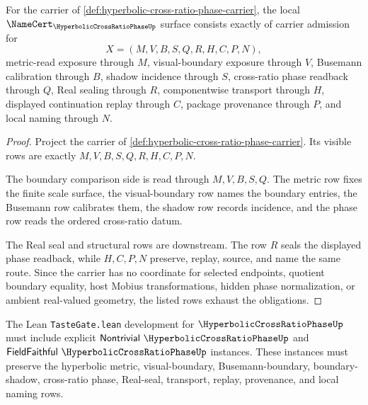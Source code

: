 \begin{theorem}
\label{thm:hyperbolic-cross-ratio-phase-namecert-obligations}
For the carrier of \autoref{def:hyperbolic-cross-ratio-phase-carrier}, the local $\NameCert_{\HyperbolicCrossRatioPhaseUp}$ surface consists exactly of carrier admission for
$$
X=(M,V,B,S,Q,R,H,C,P,N),
$$
metric-read exposure through $M$, visual-boundary exposure through $V$, Busemann calibration through $B$, shadow incidence through $S$, cross-ratio phase readback through $Q$, Real sealing through $R$, componentwise transport through $H$, displayed continuation replay through $C$, package provenance through $P$, and local naming through $N$.
\end{theorem}
\begin{proof}
Project the carrier of \autoref{def:hyperbolic-cross-ratio-phase-carrier}. Its visible rows are exactly $M,V,B,S,Q,R,H,C,P,N$.

The boundary comparison side is read through $M,V,B,S,Q$. The metric row fixes the finite scale surface, the visual-boundary row names the boundary entries, the Busemann row calibrates them, the shadow row records incidence, and the phase row reads the ordered cross-ratio datum.

The Real seal and structural rows are downstream. The row $R$ seals the displayed phase readback, while $H,C,P,N$ preserve, replay, source, and name the same route. Since the carrier has no coordinate for selected endpoints, quotient boundary equality, host Mobius transformations, hidden phase normalization, or ambient real-valued geometry, the listed rows exhaust the obligations.
\end{proof}

The Lean \texttt{TasteGate.lean} development for $\HyperbolicCrossRatioPhaseUp$ must include explicit $\mathsf{Nontrivial}\ \HyperbolicCrossRatioPhaseUp$ and $\mathsf{FieldFaithful}\ \HyperbolicCrossRatioPhaseUp$ instances. These instances must preserve the hyperbolic metric, visual-boundary, Busemann-boundary, boundary-shadow, cross-ratio phase, Real-seal, transport, replay, provenance, and local naming rows.


